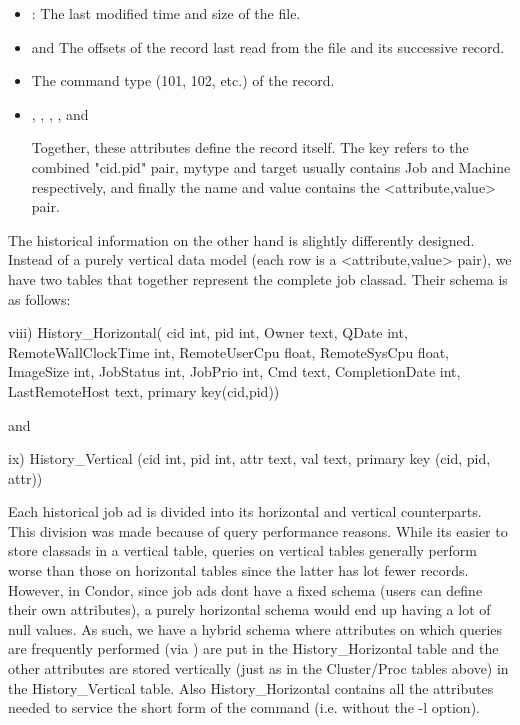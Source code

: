 \begin{enumerate}
\begin{itemize}
\item {}:
	The last modified time and size of the file.

\item {} and 
	The offsets of the record last read from the file and its successive record.

\item {}
	The command type (101, 102, etc.) of the record.

\item	{}, 
		, 
		,
		,
		and

	Together, these attributes define the record itself.	The key
	refers to the combined "cid.pid" pair, mytype and target usually
	contains Job and Machine respectively, and finally the name and
	value contains the <attribute,value> pair.
\end{itemize}

The historical information on the other hand is slightly differently
designed.  Instead of a purely vertical data model (each row is a
<attribute,value> pair), we have two tables that together represent the
complete job classad.  Their schema is as follows:

viii) History\_Horizontal(
        cid                  int,
        pid                  int,
        Owner                text,
        QDate                int,
        RemoteWallClockTime  int,
        RemoteUserCpu        float,
        RemoteSysCpu         float,
        ImageSize            int,
        JobStatus            int,
        JobPrio              int,
        Cmd                  text,
        CompletionDate       int,
        LastRemoteHost       text,
        primary key(cid,pid))

and 

ix)  History\_Vertical (cid int, pid int, attr text, val text, primary key
	(cid, pid, attr))

Each historical job ad is divided into its horizontal and vertical
counterparts.  This division was made because of query performance
reasons.  While its easier to store classads in a vertical table, queries
on vertical tables generally perform worse than those on horizontal
tables since the latter has lot fewer records.  However, in Condor,
since job ads dont have a fixed schema (users can define their own
attributes), a purely horizontal schema would end up having a lot of
null values. As such, we have a hybrid schema where attributes on which
queries are frequently performed (via ) are put in the
History\_Horizontal table and the other attributes are stored vertically
(just as in the Cluster/Proc tables above) in the History\_Vertical
table. Also History\_Horizontal contains all the attributes needed to
service the short form of the  command (i.e. without
the -l option).


\end{enumerate}

